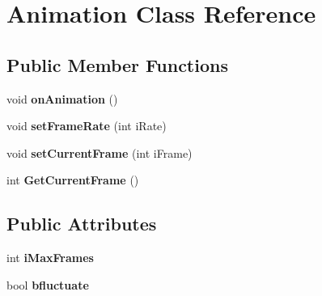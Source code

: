 \hypertarget{class_animation}{\section{Animation Class Reference}
\label{class_animation}
}
\subsection*{Public Member Functions}
\begin{DoxyCompactItemize}
\item 
\hypertarget{class_animation_a925d01846cf36477cdf1396fc8491c2a}{void {\bfseries on\+Animation} ()}\label{class_animation_a925d01846cf36477cdf1396fc8491c2a}

\item 
\hypertarget{class_animation_a766f27c5185d8a40ac8212fff70483ce}{void {\bfseries set\+Frame\+Rate} (int i\+Rate)}\label{class_animation_a766f27c5185d8a40ac8212fff70483ce}

\item 
\hypertarget{class_animation_a6d5cb157fa9676c6d46325714ab67d1d}{void {\bfseries set\+Current\+Frame} (int i\+Frame)}\label{class_animation_a6d5cb157fa9676c6d46325714ab67d1d}

\item 
\hypertarget{class_animation_af83ac9868e12f12ec252e63bb20fec70}{int {\bfseries Get\+Current\+Frame} ()}\label{class_animation_af83ac9868e12f12ec252e63bb20fec70}

\end{DoxyCompactItemize}
\subsection*{Public Attributes}
\begin{DoxyCompactItemize}
\item 
\hypertarget{class_animation_aa28d390bb19cb71a6390e117d921568a}{int {\bfseries i\+Max\+Frames}}\label{class_animation_aa28d390bb19cb71a6390e117d921568a}

\item 
\hypertarget{class_animation_a65426691a609d287408f32f27305a5c1}{bool {\bfseries bfluctuate}}\label{class_animation_a65426691a609d287408f32f27305a5c1}

\end{DoxyCompactItemize}

